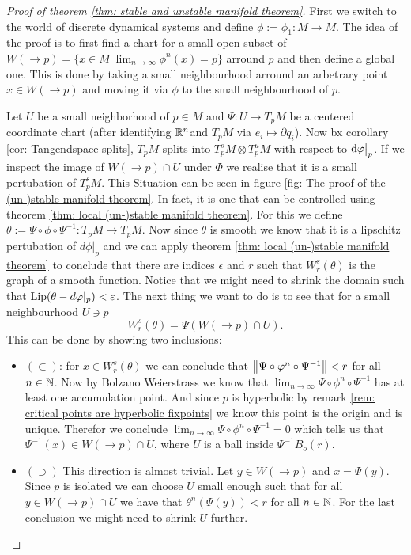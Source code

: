 \begin{proof}[Proof of theorem \ref{thm: stable and unstable manifold theorem}] First we switch to the world of discrete dynamical systems and define $\phi:=\phi_1:M\to M$. The idea of the proof is to first find a chart for a small open subset of $W(\to p)=\{x\in M| \lim_{n\to \infty} \phi^n(x)=p\}$ arround $p$ and then define a global one. This is done by taking a small neighbourhood arround an arbetrary point $x\in W(\to p)$ and moving it via $\phi$ to the small neighbourhood of $p$.
	
	Let $U$ be a small neighborhood of $p \in M$ and  $\Psi:U \to T_pM$ be a centered coordinate chart (after identifying $\mathbb{R}^n $and $T_pM$ via $e_i \mapsto \partial q_i$). Now bx corollary \ref{cor: Tangendspace splits}, $T_pM$ splits into $T^s_pM\otimes T^u_pM$ with respect to $\mathop{}\!\mathrm{d} \varphi\big|_p$. If we inspect the image of $ W(\to p)\cap U$ under $\Phi$ we realise that it is a small pertubation of $T^s_pM$. This Situation can be seen in figure \ref{fig: The proof of the (un-)stable manifold theorem}. In fact, it is one that can be controlled using theorem \ref{thm: local (un-)stable manifold theorem}. For this we define $\theta:=\Psi\circ \phi \circ \Psi^{-1}:T_pM\to T_pM$. Now since $\theta$ is smooth we know that it is a lipschitz pertubation of $d\phi|_p$ and we can apply theorem \ref{thm: local (un-)stable manifold theorem} to conclude that there are indices $\epsilon$ and $r$ such that $W^s_r(\theta)$ is the graph of a smooth function. Notice that we might need to shrink the domain such that $\mathrm{Lip}(\theta-d\varphi|_p)<\varepsilon$. The next thing we want to do is to see that for a small neighbourhood $ U \ni p$
	\begin{equation}
		W^s_r(\theta)=\Psi(W(\to p)\cap U).
	\end{equation} This can be done by showing two inclusions: 
	\begin{itemize}
		\item $(\subset)$: for $x\in W^s_r(\theta)$ we can conclude that $\left\lVert\Psi \circ \varphi^n \circ \Psi^{-1}\right\rVert<r$ for all $n\in \mathbb{N}$. Now by Bolzano Weierstrass we know that $\lim_{n\to \infty}\Psi \circ \phi^n \circ \Psi^{-1}$ has at least one accumulation point. And since $p$ is hyperbolic by remark \ref{rem: critical points are hyperbolic fixpoints} we know this point is the origin and is unique. Therefor we conclude $\lim_{n\to \infty}\Psi \circ \phi^n \circ \Psi^{-1}=0$ which tells us that $\Psi^{-1}(x)\in W(\to p)\cap U$, where $U$ is a ball inside $\Psi^{-1}B_o(r)$.
		\item $(\supset)$ This direction is almost trivial. Let $y\in W(\to p)$ and $ x=\Psi(y)$. Since  $p$ is isolated we can choose $U$ small enough such that for all $y\in W(\to p)\cap U$ we have that $\theta^n(\Psi(y))<r $ for all $n\in \mathbb{N}$. For the last conclusion we might need to shrink $U$ further.

\end{itemize}
\end{proof}
